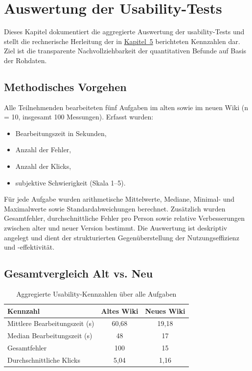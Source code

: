\section{Auswertung der Usability-Tests}
\label{sec:BB-07_usability-analysis}

Dieses Kapitel dokumentiert die aggregierte Auswertung der \Gls{usability}-Tests und stellt die rechnerische Herleitung der in \hyperref[ch:05_analysis-and-results]{Kapitel~5} berichteten Kennzahlen dar. Ziel ist die transparente Nachvollziehbarkeit der quantitativen Befunde auf Basis der Rohdaten.

\subsection{Methodisches Vorgehen}

Alle Teilnehmenden bearbeiteten fünf Aufgaben im alten sowie im neuen Wiki (n = 10, insgesamt 100 Messungen). Erfasst wurden:
\begin{itemize}
  \item Bearbeitungszeit in Sekunden,
  \item Anzahl der Fehler,
  \item Anzahl der Klicks,
  \item subjektive Schwierigkeit (Skala 1--5).
\end{itemize}

Für jede Aufgabe wurden arithmetische Mittelwerte, Mediane, Minimal- und Maximalwerte sowie Standardabweichungen berechnet. Zusätzlich wurden Gesamtfehler, durchschnittliche Fehler pro Person sowie relative Verbesserungen zwischen alter und neuer Version bestimmt. Die Auswertung ist deskriptiv angelegt und dient der strukturierten Gegenüberstellung der Nutzungseffizienz und -effektivität.

\subsection{Gesamtvergleich Alt vs. Neu}

\begin{table}[H]
\centering
\caption{Aggregierte Usability-Kennzahlen über alle Aufgaben}
\label{tab:BB-usability-overall}
\begin{tabular}{l c c}
\toprule
Kennzahl & Altes Wiki & Neues Wiki \\
\midrule
Mittlere Bearbeitungszeit (s) & 60,68 & 19,18 \\
Median Bearbeitungszeit (s) & 48 & 17 \\
Gesamtfehler & 100 & 15 \\
Durchschnittliche Klicks & 5,04 & 1,16 \\
\bottomrule
\end{tabular}
\end{table}

